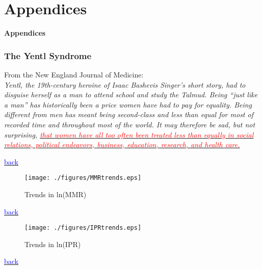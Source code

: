 \documentclass[10pt,letterpaper,subeqn]{beamer}
\begin{document}
\section{Appendices}

\begin{frame}[plain]
\begin{center}
\textbf{Appendices}
\end{center}
\end{frame}


\begin{frame}[label=Yentl]
\frametitle{The Yentl Syndrome}
From the New England Journal of Medicine: \\
\vspace{4mm}
\textit{Yentl, the 19th-century heroine of Isaac Bashevis Singer's short story, 
had to disguise herself as a man to attend school and study the Talmud. Being 
``just like a man'' has historically been a price women have had to pay for 
equality. Being different from men has meant being second-class and less than 
equal for most of recorded time and throughout most of the world. It may therefore 
be sad, but not surprising, \hyperlink{intro}{\textcolor{red}{that women have all 
too often been treated less than equally in social relations, political endeavors, 
business, education, research, and health care.}}}\\
\end{frame}


\begin{frame}[plain,label=DDreg]

{\footnotesize \hyperlink{USA}{\textcolor{blue}{back}}}
\end{frame}


\begin{frame}[plain,label=ptrends]
\begin{figure}[h!]
\centering
\caption{Trends in ln(MMR)}
\texttt{[image: ./figures/MMRtrends.eps]}
\end{figure}
{\footnotesize \hyperlink{USA}{\textcolor{blue}{back}}}
\end{frame}

\begin{frame}[plain,label=ptrends]
\begin{figure}[h!]
\centering
\caption{Trends in ln(IPR)}
\texttt{[image: ./figures/IPRtrends.eps]}
\end{figure}
{\footnotesize \hyperlink{USA}{\textcolor{blue}{back}}}
\end{frame}
\end{document}
